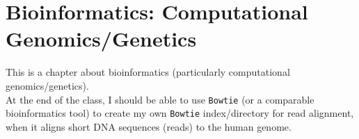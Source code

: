











\chapter{Bioinformatics: Computational Genomics/Genetics}
\label{chp:Administration}

This is a chapter about bioinformatics (particularly computational genomics/genetics). \\

At the end of the class, I should be able to use {\tt Bowtie} (or a comparable bioinformatics tool) to create my own {\tt Bowtie} index/directory for read alignment, when it aligns short DNA sequences (reads) to the human genome.


